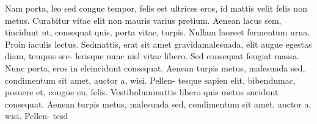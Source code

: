 Nam porta, leo sed congue tempor, felis est ultrices eros, id mattis velit felis non metus. Curabitur vitae elit non mauris varius pretium. Aenean lacus sem, tincidunt ut, consequat quis, porta vitae, turpis. Nullam laoreet fermentum urna. Proin iaculis lectus. Sedmattis, erat sit amet gravidamalesuada, elit augue egestas diam, tempus sce- lerisque nunc nisl vitae libero. Sed consequat feugiat massa. Nunc porta, eros in eleincidunt consequat. Aenean turpis metus, malesuada sed, condimentum sit amet, auctor a, wisi. 
Pellen- tesque sapien elit, bibendumac, posuere et, congue eu, felis. Vestibulummattis libero quis metus sncidunt consequat. Aenean turpis metus, malesuada sed, condimentum sit amet, auctor a, wisi. Pellen- tesd